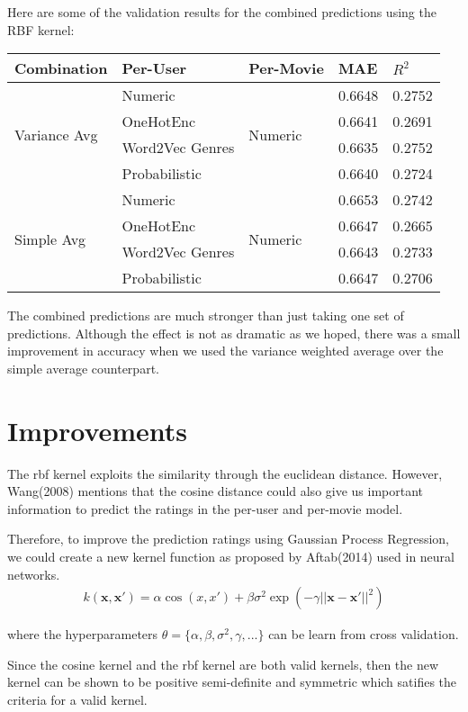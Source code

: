 \documentclass[letterpaper]{article}
\begin{document}
Here are some of the validation results for the combined predictions using the RBF kernel:
\begin{center}
	\begin{tabular}{lllll}
		Combination & Per-User & Per-Movie & MAE & $R^{2}$ \\
		\hline
		\multirow{4}{*}{Variance Avg} & Numeric & \multirow{4}{*}{Numeric} & 0.6648 & 0.2752\\
		& OneHotEnc &  & 0.6641 & 0.2691 \\
		& Word2Vec Genres &  & 0.6635 & 0.2752 \\
		& Probabilistic &  & 0.6640 & 0.2724 \\
		\hline
		\multirow{4}{*}{Simple Avg} & Numeric & \multirow{4}{*}{Numeric} & 0.6653 & 0.2742\\
		& OneHotEnc &  & 0.6647 & 0.2665 \\
		& Word2Vec Genres &  & 0.6643 & 0.2733 \\
		& Probabilistic &  & 0.6647 & 0.2706 \\
	\end{tabular}
\end{center}
The combined predictions are much stronger than just taking one set of predictions. Although the effect is not as dramatic as we hoped, there was a small improvement in accuracy when we used the variance weighted average over the simple average counterpart.

\section{Improvements}
The rbf kernel exploits the similarity through the euclidean distance. However, Wang(2008) mentions that the cosine distance could also give us important information to predict the ratings in the per-user and per-movie model.

Therefore, to improve the prediction ratings using Gaussian Process Regression, we could create a new kernel function as proposed by Aftab(2014) used in neural networks.
\begin{align*}
	k (\textbf{x},\textbf{x}') = 
	\alpha \cos(x,x') + 
	\beta\sigma^2\exp(-\gamma||\mathbf{x} - \mathbf{x}'||^{2})
\end{align*}

where the hyperparameters $\theta = \lbrace \alpha, \beta, \sigma^{2}, \gamma, ...\rbrace$ can be learn from cross validation.  

Since the cosine kernel and the rbf kernel are both valid kernels, then the new kernel can be shown to be positive semi-definite and symmetric which satifies the criteria for a valid kernel.
\end{document}
